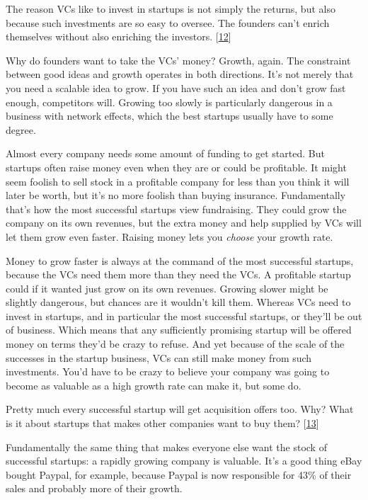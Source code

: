 The reason VCs like to invest in startups is not simply the returns,
but also because such investments are so easy to oversee.  The
founders can't enrich themselves without also enriching the investors.
[\href{\#f12n}{12}]

Why do founders want to take the VCs' money?  Growth, again.  The
constraint between good ideas and growth operates in both directions.
It's not merely that you need a scalable idea to grow.  If you have
such an idea and don't grow fast enough, competitors will.  Growing
too slowly is particularly dangerous in a business with network
effects, which the best startups usually have to some degree.

Almost every company needs some amount of funding to get started.
But startups often raise money even when they are or could be
profitable.  It might seem foolish to sell stock in a profitable
company for less than you think it will later be worth, but it's
no more foolish than buying insurance.  Fundamentally that's how
the most successful startups view fundraising.  They could grow the
company on its own revenues, but the extra money and help supplied
by VCs will let them grow even faster.  Raising money lets you
\emph{choose} your growth rate.

Money to grow faster is always at the command of the most successful
startups, because the VCs need them more than they need the VCs.
A profitable startup could if it wanted just grow on its own revenues.
Growing slower might be slightly dangerous, but chances are it
wouldn't kill them.  Whereas VCs need to invest in startups, and
in particular the most successful startups, or they'll be out of
business.  Which means that any sufficiently promising startup will
be offered money on terms they'd be crazy to refuse.  And yet because
of the scale of the successes in the startup business, VCs can still
make money from such investments.  You'd have to be crazy to believe
your company was going to become as valuable as a high growth rate
can make it, but some do.

Pretty much every successful startup will get acquisition offers
too.  Why?  What is it about startups that makes other companies
want to buy them? 
[\href{\#f13n}{13}]

Fundamentally the same thing that makes everyone else want the stock
of successful startups: a rapidly growing company is valuable.  It's
a good thing eBay bought Paypal, for example, because Paypal is now
responsible for 43\% of their sales and probably more of their growth.

